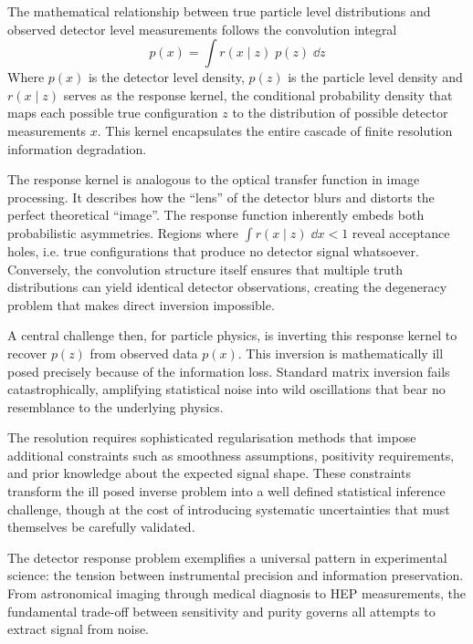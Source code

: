    The mathematical relationship between true particle level distributions and observed detector level measurements follows the convolution integral
    \[
        \label{eq:forward-folding}
        p(x) = \int r(x\mid z)\;p(z)\; \dd z
    \]
    Where \(p(x)\) is the detector level density, \(p(z)\) is the particle level density and \(r(x\mid z)\) serves as the response kernel, the conditional probability density that maps each possible true configuration \(z\) to the distribution of possible detector measurements \(x\).
    This kernel encapsulates the entire cascade of finite resolution information degradation.
    
    The response kernel is analogous to the optical transfer function in image processing.
    It describes how the ``lens'' of the detector blurs and distorts the perfect theoretical ``image''.
    The response function inherently embeds both probabilistic asymmetries.
    Regions where \(\int r(x\mid z)\;\dd x < 1\) reveal acceptance holes, i.e. true configurations that produce no detector signal whatsoever.
    Conversely, the convolution structure itself ensures that multiple truth distributions can yield identical detector observations, creating the degeneracy problem that makes direct inversion impossible.
    
    A central challenge then, for particle physics, is inverting this response kernel to recover \(p(z)\) from observed data \(p(x)\).
    This inversion is mathematically ill posed precisely because of the information loss.
    Standard matrix inversion fails catastrophically, amplifying statistical noise into wild oscillations that bear no resemblance to the underlying physics.
    
    The resolution requires sophisticated regularisation methods that impose additional constraints such as smoothness assumptions, positivity requirements, and prior knowledge about the expected signal shape.
    These constraints transform the ill posed inverse problem into a well defined statistical inference challenge, though at the cost of introducing systematic uncertainties that must themselves be carefully validated.
    
    The detector response problem exemplifies a universal pattern in experimental science: the tension between instrumental precision and information preservation.
    From astronomical imaging through medical diagnosis to HEP measurements, the fundamental trade-off between sensitivity and purity governs all attempts to extract signal from noise.


